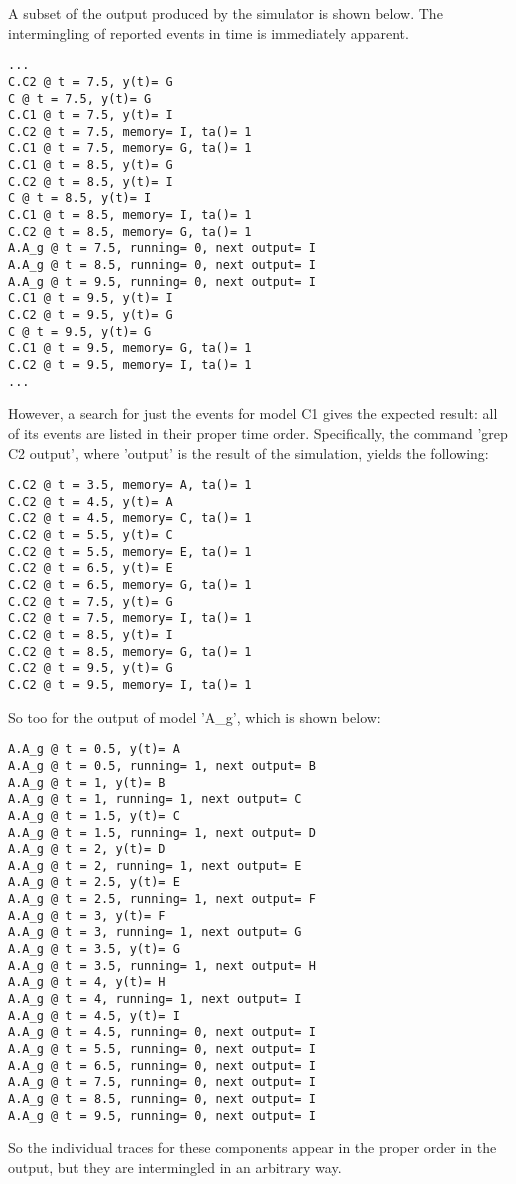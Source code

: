 A subset of the output produced by the simulator is shown below. The intermingling of reported events in time is immediately apparent.
\begin{verbatim}
...
C.C2 @ t = 7.5, y(t)= G
C @ t = 7.5, y(t)= G
C.C1 @ t = 7.5, y(t)= I
C.C2 @ t = 7.5, memory= I, ta()= 1
C.C1 @ t = 7.5, memory= G, ta()= 1
C.C1 @ t = 8.5, y(t)= G
C.C2 @ t = 8.5, y(t)= I
C @ t = 8.5, y(t)= I
C.C1 @ t = 8.5, memory= I, ta()= 1
C.C2 @ t = 8.5, memory= G, ta()= 1
A.A_g @ t = 7.5, running= 0, next output= I
A.A_g @ t = 8.5, running= 0, next output= I
A.A_g @ t = 9.5, running= 0, next output= I
C.C1 @ t = 9.5, y(t)= I
C.C2 @ t = 9.5, y(t)= G
C @ t = 9.5, y(t)= G
C.C1 @ t = 9.5, memory= G, ta()= 1
C.C2 @ t = 9.5, memory= I, ta()= 1
...
\end{verbatim}
However, a search for just the events for model C1 gives the expected result: all of its events are listed in their proper time order. Specifically, the command 'grep C2 output', where 'output' is the result of the simulation, yields the following:
\begin{verbatim}
C.C2 @ t = 3.5, memory= A, ta()= 1
C.C2 @ t = 4.5, y(t)= A
C.C2 @ t = 4.5, memory= C, ta()= 1
C.C2 @ t = 5.5, y(t)= C
C.C2 @ t = 5.5, memory= E, ta()= 1
C.C2 @ t = 6.5, y(t)= E
C.C2 @ t = 6.5, memory= G, ta()= 1
C.C2 @ t = 7.5, y(t)= G
C.C2 @ t = 7.5, memory= I, ta()= 1
C.C2 @ t = 8.5, y(t)= I
C.C2 @ t = 8.5, memory= G, ta()= 1
C.C2 @ t = 9.5, y(t)= G
C.C2 @ t = 9.5, memory= I, ta()= 1
\end{verbatim}
So too for the output of model 'A\_g', which is shown below:
\begin{verbatim}
A.A_g @ t = 0.5, y(t)= A
A.A_g @ t = 0.5, running= 1, next output= B
A.A_g @ t = 1, y(t)= B
A.A_g @ t = 1, running= 1, next output= C
A.A_g @ t = 1.5, y(t)= C
A.A_g @ t = 1.5, running= 1, next output= D
A.A_g @ t = 2, y(t)= D
A.A_g @ t = 2, running= 1, next output= E
A.A_g @ t = 2.5, y(t)= E
A.A_g @ t = 2.5, running= 1, next output= F
A.A_g @ t = 3, y(t)= F
A.A_g @ t = 3, running= 1, next output= G
A.A_g @ t = 3.5, y(t)= G
A.A_g @ t = 3.5, running= 1, next output= H
A.A_g @ t = 4, y(t)= H
A.A_g @ t = 4, running= 1, next output= I
A.A_g @ t = 4.5, y(t)= I
A.A_g @ t = 4.5, running= 0, next output= I
A.A_g @ t = 5.5, running= 0, next output= I
A.A_g @ t = 6.5, running= 0, next output= I
A.A_g @ t = 7.5, running= 0, next output= I
A.A_g @ t = 8.5, running= 0, next output= I
A.A_g @ t = 9.5, running= 0, next output= I
\end{verbatim}
So the individual traces for these components appear in the proper order in the output, but they are intermingled in an arbitrary way. 

